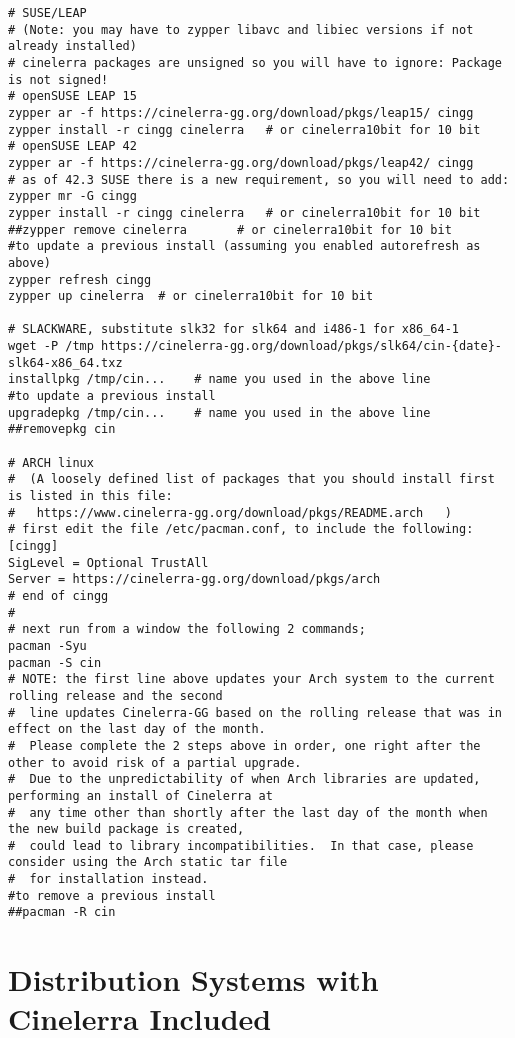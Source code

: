 \begin{lstlisting}[numbers=none]
# SUSE/LEAP
# (Note: you may have to zypper libavc and libiec versions if not already installed)
# cinelerra packages are unsigned so you will have to ignore: Package is not signed!
# openSUSE LEAP 15
zypper ar -f https://cinelerra-gg.org/download/pkgs/leap15/ cingg
zypper install -r cingg cinelerra   # or cinelerra10bit for 10 bit
# openSUSE LEAP 42
zypper ar -f https://cinelerra-gg.org/download/pkgs/leap42/ cingg
# as of 42.3 SUSE there is a new requirement, so you will need to add:
zypper mr -G cingg
zypper install -r cingg cinelerra   # or cinelerra10bit for 10 bit
##zypper remove cinelerra	    # or cinelerra10bit for 10 bit
#to update a previous install (assuming you enabled autorefresh as above)
zypper refresh cingg
zypper up cinelerra  # or cinelerra10bit for 10 bit

# SLACKWARE, substitute slk32 for slk64 and i486-1 for x86_64-1
wget -P /tmp https://cinelerra-gg.org/download/pkgs/slk64/cin-{date}-slk64-x86_64.txz
installpkg /tmp/cin...    # name you used in the above line
#to update a previous install
upgradepkg /tmp/cin...    # name you used in the above line
##removepkg cin

# ARCH linux
#  (A loosely defined list of packages that you should install first is listed in this file:
#   https://www.cinelerra-gg.org/download/pkgs/README.arch   )
# first edit the file /etc/pacman.conf, to include the following:
[cingg]
SigLevel = Optional TrustAll
Server = https://cinelerra-gg.org/download/pkgs/arch
# end of cingg
#
# next run from a window the following 2 commands;
pacman -Syu
pacman -S cin
# NOTE: the first line above updates your Arch system to the current rolling release and the second
#  line updates Cinelerra-GG based on the rolling release that was in effect on the last day of the month.
#  Please complete the 2 steps above in order, one right after the other to avoid risk of a partial upgrade.
#  Due to the unpredictability of when Arch libraries are updated, performing an install of Cinelerra at
#  any time other than shortly after the last day of the month when the new build package is created,
#  could lead to library incompatibilities.  In that case, please consider using the Arch static tar file
#  for installation instead.
#to remove a previous install
##pacman -R cin
\end{lstlisting}

\section{Distribution Systems with Cinelerra Included}%
\label{sec:distribution_systems_with_cinelerra_included}

